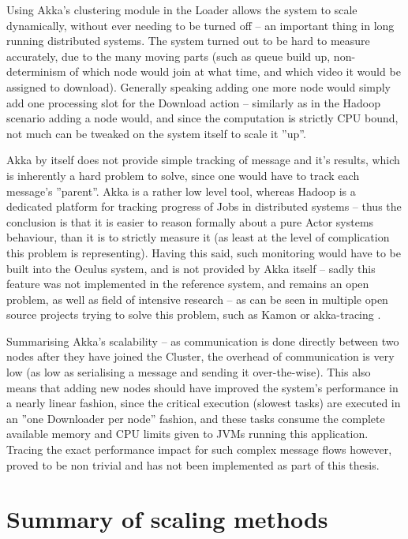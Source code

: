 Using Akka's clustering module in the Loader allows the system to scale dynamically, without ever needing to be turned off -- an important thing in long running distributed systems. The system turned out to be hard to measure accurately, due to the many moving parts (such as queue build up, non-determinism of which node would join at what time, and which video it would be assigned to download). Generally speaking adding one more node would simply add one processing slot for the Download action -- similarly as in the Hadoop scenario adding a node would, and since the computation is strictly CPU bound, not much can be tweaked on the system itself to scale it ''up''.

Akka by itself does not provide simple tracking of message and it's results, which is inherently a hard problem to solve, since one would have to track each message's ''parent''. Akka is a rather low level tool, whereas Hadoop is a dedicated platform for tracking progress of Jobs in distributed systems -- thus the conclusion is that it is easier to reason formally about a pure Actor systems behaviour, than it is to strictly measure it (as least at the level of complication this problem is representing). Having this said, such monitoring would have to be built into the Oculus system, and is not provided by Akka itself -- sadly this feature was not implemented in the reference system, and remains an open problem, as well as field of intensive research -- as can be seen in multiple open source projects trying to solve this problem, such as Kamon \cite{kamon} or akka-tracing \cite{akka-tracing}.

Summarising Akka's scalability -- as communication is done directly between two nodes after they have joined the Cluster, the overhead of communication is very low (as low as serialising a message and sending it over-the-wise). This also means that adding new nodes should have improved the system's performance in a nearly linear fashion, since the critical execution (slowest tasks) are executed in an ''one Downloader per node'' fashion, and these tasks consume the complete available memory and CPU limits given to JVMs running this application. Tracing the exact performance impact for such complex message flows however, proved to be non trivial and has not been implemented as part of this thesis.



\section{Summary of scaling methods}
\label{sec:scaling-summary}

